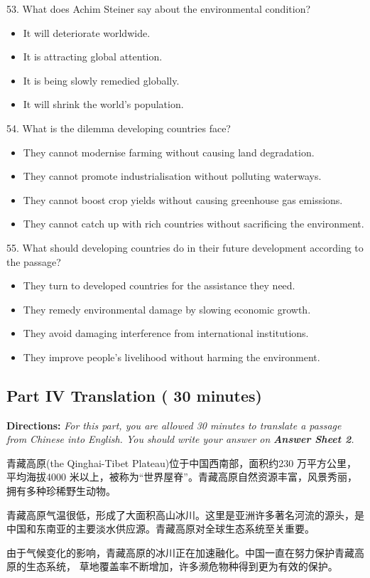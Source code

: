 \documentclass[UTF8,11pt]{ctexart}
\begin{document}
53. What does Achim Steiner say about the environmental condition?


\begin{itemize}[leftmargin=2em,itemsep=.2em,topsep=.4em]\item[A.] It will deteriorate worldwide.
\item[B.] It is attracting global attention.
\item[C.] It is being slowly remedied globally.
\item[D.] It will shrink the world’s population.
\end{itemize}

54. What is the dilemma developing countries face?


\begin{itemize}[leftmargin=2em,itemsep=.2em,topsep=.4em]\item[A.] They cannot modernise farming without causing land degradation.
\item[B.] They cannot promote industrialisation without polluting waterways.
\item[C.] They cannot boost crop yields without causing greenhouse gas emissions.
\item[D.] They cannot catch up with rich countries without sacrificing the environment.
\end{itemize}

55. What should developing countries do in their future development according to the passage?


\begin{itemize}[leftmargin=2em,itemsep=.2em,topsep=.4em]\item[A.] They turn to developed countries for the assistance they need.
\item[B.] They remedy environmental damage by slowing economic growth.
\item[C.] They avoid damaging interference from international institutions.
\item[D.] They improve people’s livelihood without harming the environment.
\end{itemize}

\subsection*{\textbf{Part IV Translation} \textbf{( 30 minutes)}}


\textbf{Directions: }\textit{For this part, you are allowed 30 minutes to translate a passage from Chinese into English. You should} \textit{write your answer on }\textbf{\textit{Answer Sheet 2}}\textit{.}


青藏高原(the Qinghai-Tibet Plateau)位于中国西南部，面积约230 万平方公里，平均海拔4000 米以上，被称为“世界屋脊”。青藏高原自然资源丰富，风景秀丽，拥有多种珍稀野生动物。


青藏高原气温很低，形成了大面积高山冰川。这里是亚洲许多著名河流的源头，是中国和东南亚的主要淡水供应源。青藏高原对全球生态系统至关重要。


由于气候变化的影响，青藏高原的冰川正在加速融化。中国一直在努力保护青藏高原的生态系统， 草地覆盖率不断增加，许多濒危物种得到更为有效的保护。
\end{document}
